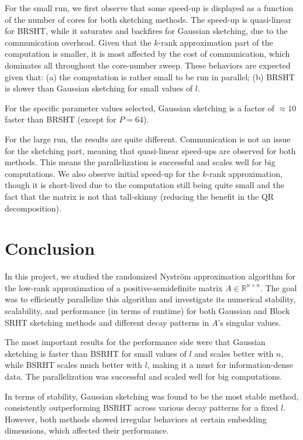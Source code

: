 \documentclass[a4paper, 12pt,oneside]{article}
\begin{document}
For the small run, we first observe that some speed-up is displayed as a function of the number of cores for both sketching methods. The speed-up is quasi-linear for BRSHT, while it saturates and backfires for Gaussian sketching, due to the communication overhead. Given that the $k$-rank approximation part of the computation is smaller, it is most affected by the cost of communication, which dominates all throughout the core-number sweep. These behaviors are expected given that: (a) the computation is rather small to be run in parallel; (b) BRSHT is slower than Gaussian sketching for small values of $l$.

For the specific parameter values selected, Gaussian sketching is a factor of $\approx 10$ faster than BRSHT (except for $P=64$).

For the large run, the results are quite different. Communication is not an issue for the sketching part, meaning that quasi-linear speed-ups are observed for both methods. This means the parallelization is successful and scales well for big computations. We also observe initial speed-up for the $k$-rank approximation, though it is short-lived due to the computation still being quite small and the fact that the matrix is not that tall-skinny (reducing the benefit in the QR decomposition).

\vspace{-0.5em} %
\section{Conclusion}
In this project, we studied the randomized Nystr\"om approximation algorithm for the low-rank approximation of a positive-semidefinite matrix $A \in \mathbb{R}^{n \times n}$. The goal was to efficiently parallelize this algorithm and investigate its numerical stability, scalability, and performance (in terms of runtime) for both Gaussian and Block SRHT sketching methods and different decay patterns in $A$'s singular values.

The most important results for the performance side were that Gaussian sketching is faster than BSRHT for small values of $l$ and scales better with $n$, while BSRHT scales much better with $l$, making it a must for information-dense data. The parallelization was successful and scaled well for big computations.

In terms of stability, Gaussian sketching was found to be the most stable method, consistently outperforming BSRHT across various decay patterns for a fixed $l$. However, both methods showed irregular behaviors at certain embedding dimensions, which affected their performance.
\end{document}
